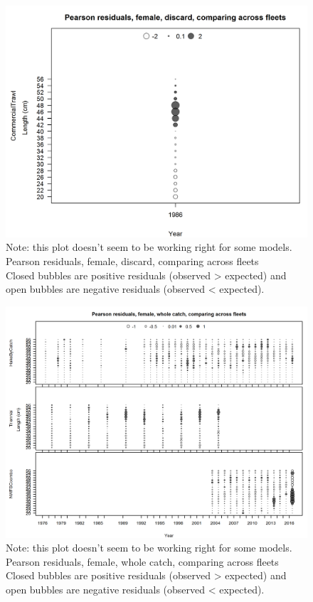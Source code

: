 \documentclass[12pt,]{article}
\begin{document}
\begin{figure}[htbp]
\centering
\includegraphics{./r4ss/plots_mod1/comp_lenfit_sex2mkt1_multi-fleet_comparison.png}
\caption{Note: this plot doesn't seem to be working right for some
models. Pearson residuals, female, discard, comparing across fleets\\
Closed bubbles are positive residuals (observed \textgreater{} expected)
and open bubbles are negative residuals (observed \textless{} expected).
\label{fig:mod1_34_comp_lenfit_sex2mkt1_multi-fleet_comparison}}
\end{figure}

\begin{figure}[htbp]
\centering
\includegraphics{./r4ss/plots_mod1/comp_lenfit_sex2mkt0_multi-fleet_comparison.png}
\caption{Note: this plot doesn't seem to be working right for some
models. Pearson residuals, female, whole catch, comparing across
fleets\\
Closed bubbles are positive residuals (observed \textgreater{} expected)
and open bubbles are negative residuals (observed \textless{} expected).
\label{fig:mod1_35_comp_lenfit_sex2mkt0_multi-fleet_comparison}}
\end{figure}
\end{document}

